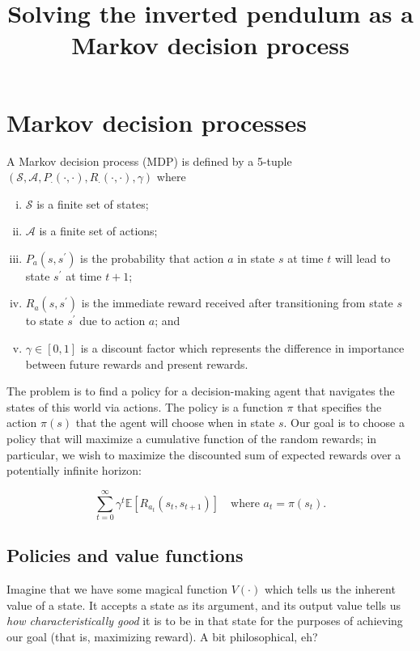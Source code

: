 \documentclass[12pt]{article}
\title{Solving the inverted pendulum as a Markov decision process}
\date{}
\begin{document}
\maketitle

\section{Markov decision processes}

A Markov decision process (MDP) is defined by a 5-tuple $(\mathscr{S}, \mathscr{A}, P_\cdot(\cdot, \cdot), R_\cdot(\cdot, \cdot), \gamma)$ where

\begin{enumerate}[(i)]
\item $\mathscr{S}$ is a finite set of states;
\item $\mathscr{A}$ is a finite set of actions;
\item $P_a(s, s^\prime)$ is the probability that action $a$ in state $s$ at time $t$ will lead to state $s^\prime$ at time $t + 1$;
\item $R_a(s, s^\prime)$ is the immediate reward received after transitioning from state $s$ to state $s^\prime$ due to action $a$; and
\item $\gamma \in [0, 1]$ is a discount factor which represents the difference in importance between future rewards and present rewards.
\end{enumerate}

The problem is to find a policy for a decision-making agent that navigates the states of this world via actions. The policy is a function $\pi$ that specifies the action $\pi(s)$ that the agent will choose when in state $s$. Our goal is to choose a policy that will maximize a cumulative function of the random rewards; in particular, we wish to maximize the discounted sum of expected rewards over a potentially infinite horizon:

\begin{equation}
\sum_{t = 0}^{\infty} \gamma^t \mathbb{E}[R_{a_t}(s_t, s_{t+1})] \quad \mbox{where } a_t = \pi(s_t).
\end{equation}

\subsection{Policies and value functions}

Imagine that we have some magical function $V(\cdot)$ which tells us the inherent value of a state. It accepts a state as its argument, and its output value tells us \emph{how characteristically good} it is to be in that state for the purposes of achieving our goal (that is, maximizing reward). A bit philosophical, eh?
\end{document}
